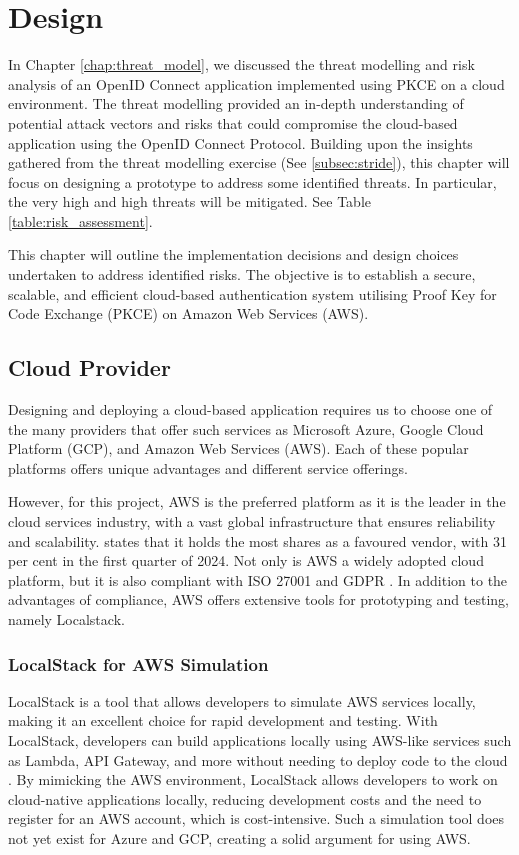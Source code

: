 \chapter{Design}
\label{chap:design}
In Chapter \ref{chap:threat_model}, we discussed the threat modelling and risk analysis of an OpenID Connect application implemented using PKCE on a cloud environment. The threat modelling provided an in-depth understanding of potential attack vectors and risks that could compromise the cloud-based application using the OpenID Connect Protocol. Building upon the insights gathered from the threat modelling exercise (See \ref{subsec:stride}), this chapter will focus on designing a prototype to address some identified threats. In particular, the very high and high threats will be mitigated. See Table \ref{table:risk_assessment}. 

This chapter will outline the implementation decisions and design choices undertaken to address identified risks. The objective is to establish a secure, scalable, and efficient cloud-based authentication system utilising Proof Key for Code Exchange (PKCE) on Amazon Web Services (AWS).

\section{Cloud Provider}
\label{sec:cloud_provider}
Designing and deploying a cloud-based application requires us to choose one of the many providers that offer such services as Microsoft Azure, Google Cloud Platform (GCP), and Amazon Web Services (AWS). Each of these popular platforms offers unique advantages and different service offerings. 

However, for this project, AWS is the preferred platform as it is the leader in the cloud services industry, with a vast global infrastructure that ensures reliability and scalability. \cite{aws_leader} states that it holds the most shares as a favoured vendor, with 31 per cent in the first quarter of 2024. Not only is AWS a widely adopted cloud platform, but it is also compliant with ISO 27001 and GDPR \citep{aws_iso}. In addition to the advantages of compliance, AWS offers extensive tools for prototyping and testing, namely Localstack.

\subsection{LocalStack for AWS Simulation}
LocalStack is a tool that allows developers to simulate AWS services locally, making it an excellent choice for rapid development and testing. With LocalStack, developers can build applications locally using AWS-like services such as Lambda, API Gateway, and more without needing to deploy code to the cloud \citep{localstack}. By mimicking the AWS environment, LocalStack allows developers to work on cloud-native applications locally, reducing development costs and the need to register for an AWS account, which is cost-intensive. Such a simulation tool does not yet exist for Azure and GCP, creating a solid argument for using AWS.


